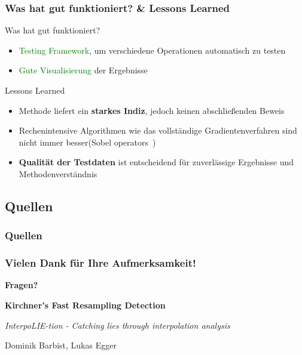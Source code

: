 \documentclass[11pt,t,usepdftitle=false,aspectratio=169]{beamer}
\begin{document}
\begin{frame}
	\frametitle{Was hat gut funktioniert? \& Lessons Learned}
	\begin{exampleblock}{Was hat gut funktioniert?}
		\begin{itemize}
			\item \textcolor{green}{Testing Framework}, um verschiedene Operationen automatisch zu testen
			\item \textcolor{green}{Gute Visualisierung} der Ergebnisse
		\end{itemize}
	\end{exampleblock}
	\vspace{1em}
    \begin{block}{Lessons Learned}
        \begin{itemize}
			\item Methode liefert ein \textbf{starkes Indiz}, jedoch keinen abschließenden Beweis
			\item Rechenintensive Algorithmen wie das vollständige Gradientenverfahren sind nicht immer besser(Sobel operators~\cite{noauthor_sobel_2025})
			\item \textbf{Qualität der Testdaten} ist entscheidend für zuverlässige Ergebnisse und Methodenverständnis
        \end{itemize}
    \end{block}
\end{frame}

\subsection{Quellen}
\begin{frame}
    \frametitle{Quellen}
    \begingroup
    \setlength{\bibitemsep}{2pt}
    \setlength{\itemsep}{0pt}
    \setlength{\parskip}{0pt}
    \renewcommand{\bibfont}{\tiny}
    \printbibliography[heading=none]
    \endgroup
\end{frame}

\begin{frame}
	\frametitle{Vielen Dank für Ihre Aufmerksamkeit!}
	
	\vspace{2em}
	
	\begin{center}
		\Large{\textbf{Fragen?}}
		
		\vspace{1.5em}
		
		\textbf{Kirchner's Fast Resampling Detection}
		
		\textit{InterpoLIE-tion - Catching lies through interpolation analysis}
		
		\vspace{1.5em}
		
		\small{Dominik Barbist, Lukas Egger}
	\end{center}
\end{frame}
\end{document}
